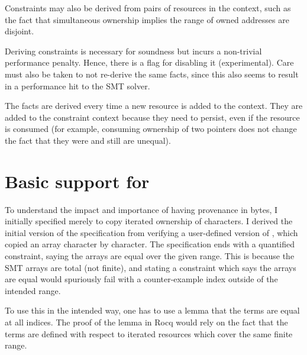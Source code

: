
Constraints may also be derived from pairs of resources in the context, such as
the fact that simultaneous ownership implies the range of owned addresses are
disjoint.


Deriving constraints is necessary for soundness but incurs a non-trivial
performance penalty. Hence, there is a flag for disabling it (experimental).
Care must also be taken to not re-derive the same facts, since this also seems
to result in a performance hit to the SMT
solver.


The facts are derived every time a new resource is added to the context.
They are added to the constraint context because they need to persist,
even if the resource is consumed (for example, consuming ownership
of two pointers does not change the fact that they were and still
are unequal).


\section{Basic support for }

To understand the impact and importance of having provenance in
bytes, I initially specified  merely to copy iterated
ownership of characters. I derived the initial version of the specification
from verifying a user-defined version of , which copied an
array character by character. The specification ends with a quantified constraint,
saying the arrays are equal over the given range. This is because the SMT arrays
are total (not finite), and stating a constraint which says the arrays are equal
would spuriously fail with a counter-example index outside of the intended range.


To use this in the intended way, one has to use a lemma that the terms are
equal at all indices. The proof of the lemma in Rocq would rely on the fact
that the terms are defined with respect to iterated resources which cover the
same finite range.

